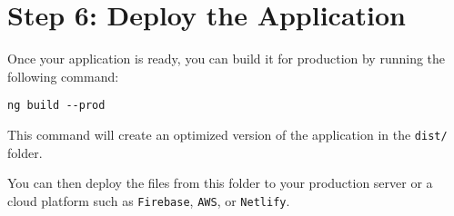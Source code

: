 \documentclass{article}
\begin{document}
\section*{Step 6: Deploy the Application}
Once your application is ready, you can build it for production by running the following command:
\begin{verbatim}
ng build --prod
\end{verbatim}

This command will create an optimized version of the application in the \texttt{dist/} folder.

You can then deploy the files from this folder to your production server or a cloud platform such as \texttt{Firebase}, \texttt{AWS}, or \texttt{Netlify}.
\end{document}
